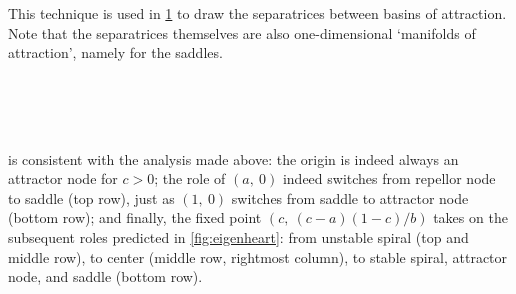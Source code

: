 This technique is used in \cref{fig:beautiful_phase_spaces} to draw the separatrices between basins of attraction. Note that the separatrices themselves are also one-dimensional `manifolds of attraction', namely for the saddles.

\begin{landscape}
\begin{figure}
\vspace{-5.2em}
 \\[2.4em] %
 \\[2.4em]
 \\[0.3em]
\label{fig:beautiful_phase_spaces}
\end{figure}
\end{landscape}

 is consistent with the analysis made above: the origin is indeed always an attractor node for $c > 0$; the role of $(a,\ 0)$ indeed switches from repellor node to saddle (top row), just as $(1,\ 0)$ switches from saddle to attractor node (bottom row); and finally, the fixed point $(c,\ (c-a)(1-c)/b)$ takes on the subsequent roles predicted in \cref{fig:eigenheart}: from unstable spiral (top and middle row), to center (middle row, rightmost column), to stable spiral, attractor node, and saddle (bottom row).

